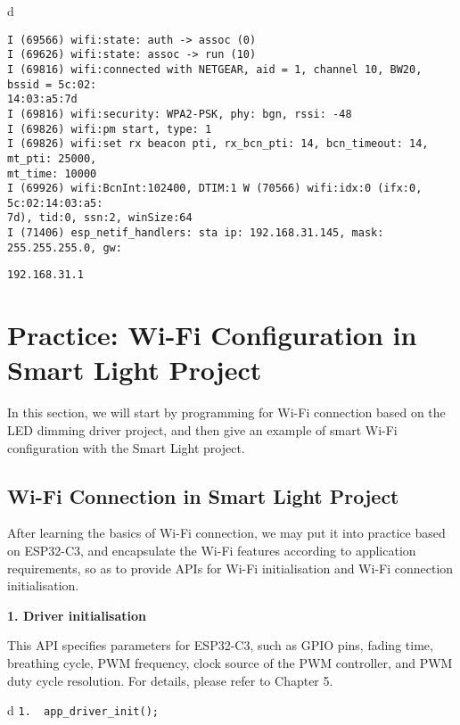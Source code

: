 \documentclass[a4paper,12pt]{book}
\begin{document}
\begin{codebloc}
\fontsize{9.9pt}{9.9pt}\selectfont
\begin{tabular}{d}
\vspace{2pt}
\begin{verbatim}
I (69566) wifi:state: auth -> assoc (0)
I (69626) wifi:state: assoc -> run (10) 
I (69816) wifi:connected with NETGEAR, aid = 1, channel 10, BW20, bssid = 5c:02:
14:03:a5:7d
I (69816) wifi:security: WPA2-PSK, phy: bgn, rssi: -48
I (69826) wifi:pm start, type: 1
I (69826) wifi:set rx beacon pti, rx_bcn_pti: 14, bcn_timeout: 14, mt_pti: 25000,
mt_time: 10000
I (69926) wifi:BcnInt:102400, DTIM:1 W (70566) wifi:idx:0 (ifx:0, 5c:02:14:03:a5:
7d), tid:0, ssn:2, winSize:64
I (71406) esp_netif_handlers: sta ip: 192.168.31.145, mask: 255.255.255.0, gw:
\end{verbatim} 
\verb|192.168.31.1|
\end{tabular}
\end{codebloc}

\section{Practice: Wi-Fi Configuration in Smart Light Project}
In this section, we will start by programming for Wi-Fi connection based on the LED dimming driver project, and then give an example of smart Wi-Fi configuration with the Smart Light project.

\subsection{Wi-Fi Connection in Smart Light Project}
After learning the basics of Wi-Fi connection, we may put it into practice based on ESP32-C3, and encapsulate the Wi-Fi features according to application requirements, so as to provide APIs for Wi-Fi initialisation and Wi-Fi connection initialisation.

\textbf{1. Driver initialisation}

This API specifies parameters for ESP32-C3, such as GPIO pins, fading time, breathing cycle, PWM frequency, clock source of the PWM controller, and PWM duty cycle resolution. For details, please refer to Chapter 5.

\begin{codebloc}
\begin{tabular}{d}
\verb|1.  app_driver_init();|
\end{tabular}
\end{codebloc}
\end{document}
